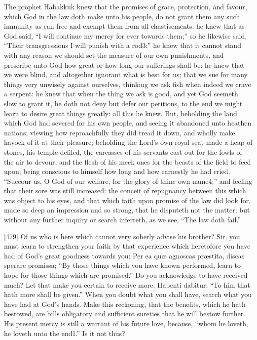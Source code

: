 The prophet Habakkuk knew that the promises of grace, protection, and favour, which God in the law doth make unto his people, do not grant them any such immunity as can free and exempt them from all chastisements: he knew that as God said, “I will continue my mercy for ever towards them;” so he likewise said, “Their transgressions I will punish with a rod3:” he knew that it cannot stand with any reason we should set the measure of our own punishments, and prescribe unto God how great or how long our sufferings shall be: he knew that we were blind, and altogether ignorant what is best for us; that we sue for many things very unwisely against ourselves, thinking we ask fish when indeed we crave a serpent: he knew that when the thing we ask is good, and yet God seemeth slow to grant it, he doth not deny but defer our petitions, to the end we might learn to desire great things greatly: all this he knew. But, beholding the land which God had severed for his own people, and seeing it abandoned unto heathen nations; viewing how reproachfully they did tread it down, and wholly make havock of it at their pleasure; beholding the Lord’s own royal seat made a heap of stones, his temple defiled, the carcasses of his servants cast out for the fowls of the air to devour, and the flesh of his meek ones for the beasts of the field to feed upon; being conscious to himself how long and how earnestly he had cried, “Succour us, O God of our welfare, for the glory of thine own name4;” and feeling that their sore was still increased: the conceit of repugnancy between this which was object to his eyes, and that which faith upon promise of the law did look for, made so deep an impression and so strong, that he disputeth not the matter; but without any further inquiry or search inferreth, as we see, “The law doth fail.”

[479]
Of us who is here which cannot very soberly advise his brother? Sir, you must learn to strengthen your faith by that experience which heretofore you have had of God’s great goodness towards you: Per ea quæ agnoscas præstita, discas sperare promissa; “By those things which you have known performed, learn to hope for those things which are promised.” Do you acknowledge to have received much? Let that make you certain to receive more: Habenti dabitur; “To him that hath more shall be given.” When you doubt what you shall have, search what you have had at God’s hands. Make this reckoning, that the benefits, which he hath bestowed, are bills obligatory and sufficient sureties that he will bestow further. His present mercy is still a warrant of his future love, because, “whom he loveth, he loveth unto the end1.” Is it not thus?

